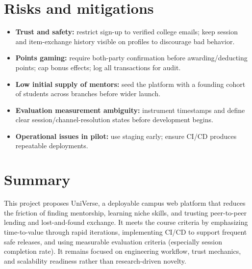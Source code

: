 \documentclass[11pt,a4paper]{article}
\begin{document}
\section{Risks and mitigations}
\begin{itemize}[leftmargin=0.7cm]
    \item \textbf{Trust and safety:} restrict sign-up to verified college emails; keep session and item-exchange history visible on profiles to discourage bad behavior.
    \item \textbf{Points gaming:} require both-party confirmation before awarding/deducting points; cap bonus effects; log all transactions for audit.
    \item \textbf{Low initial supply of mentors:} seed the platform with a founding cohort of students across branches before wider launch.
    \item \textbf{Evaluation measurement ambiguity:} instrument timestamps and define clear session/channel-resolution states before development begins.
    \item \textbf{Operational issues in pilot:} use staging early; ensure CI/CD produces repeatable deployments.
\end{itemize}

\section{Summary}
This project proposes UniVerse, a deployable campus web platform that reduces the friction of finding mentorship, learning niche skills, and trusting peer-to-peer lending and lost-and-found exchange. It meets the course criteria by emphasizing time-to-value through rapid iterations, implementing CI/CD to support frequent safe releases, and using measurable evaluation criteria (especially session completion rate). It remains focused on engineering workflow, trust mechanics, and scalability readiness rather than research-driven novelty.
\end{document}
